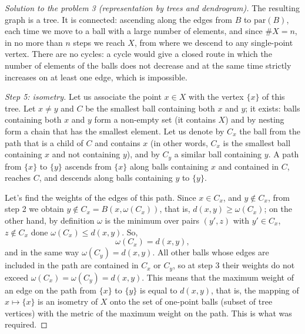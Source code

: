 \documentclass[a4paper,12pt]{report}
\begin{document}
\begin{proof}[Solution to the problem \textup{3} \textup{(}representation by trees and dendrogram\textup{)}]
The resulting graph is a tree. It is connected\textup{:} ascending along the edges from $B$ to $\mathrm{par}(B)$, each time we move to a ball with a large number of elements, and since $\#X=n$, in no more than $n$ steps we reach $X$, from where we descend to any single-point vertex. There are no cycles\textup{:} a cycle would give a closed route in which the number of elements of the balls does not decrease and at the same time strictly increases on at least one edge, which is impossible.

\textit{Step \textup{5}\textup{:} isometry.} Let us associate the point $x\in X$ with the vertex $\{x\}$ of this tree. Let $x\ne y$ and $C$ be the smallest ball containing both $x$ and $y$\textup{;} it exists\textup{:} balls containing both $x$ and $y$ form a non-empty set \textup{(}it contains $X$\textup{)} and by nesting form a chain that has the smallest element. Let us denote by $C_x$ the ball from the path that is a child of $C$ and contains $x$ \textup{(}in other words, $C_x$ is the smallest ball containing $x$ and not containing $y$\textup{)}, and by $C_y$ a similar ball containing $y$. A path from $\{x\}$ to $\{y\}$ ascends from $\{x\}$ along balls containing $x$ and contained in $C$, reaches $C$, and descends along balls containing $y$ to $\{y\}$.

Let's find the weights of the edges of this path. Since $x\in C_x$, and $y\notin C_x$, from step \textup{2} we obtain $y\notin C_x=B(x,\omega(C_x))$, that is, $d(x,y)\ge\omega(C_x)$\textup{;} on the other hand, by definition $\omega$ is the minimum over pairs $(y',z)$ with $y'\in C_x$, $z\notin C_x$ done $\omega(C_x)\le d(x,y)$. So,
\[
\omega(C_x)=d(x,y),
\]
and in the same way $\omega(C_y)=d(x,y)$. All other balls whose edges are included in the path are contained in $C_x$ or $C_y$, so at step \textup{3} their weights do not exceed $\omega(C_x)=\omega(C_y)=d(x,y)$. This means that the maximum weight of an edge on the path from $\{x\}$ to $\{y\}$ is equal to $d(x,y)$, that is, the mapping of $x\mapsto\{x\}$ is an isometry of $X$ onto the set of one-point balls \textup{(}subset of tree vertices\textup{)} with the metric of the maximum weight on the path. This is what was required.


\end{proof}
\end{document}
